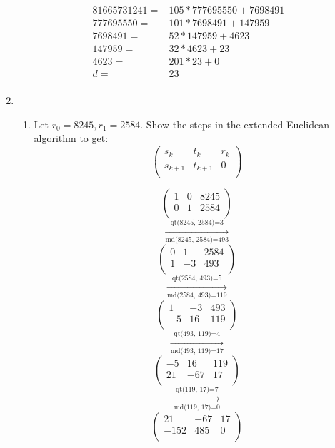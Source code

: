 \documentclass[11pt]{article}
\begin{document}
\begin{enumerate}
\begin{align*}
81665731241 =& 105 * 777695550 + 7698491\\
777695550 =& 101 * 7698491 + 147959\\
7698491 =& 52 * 147959 + 4623\\
147959 =& 32 * 4623 + 23\\
4623 =& 201 * 23 + 0\\
d =& 23\\
\end{align*}

\newpage %
\item 
\begin{enumerate}
\item Let $r_0 = 8245, r_1 = 2584$.  Show the steps in the extended Euclidean algorithm to get:
\begin{equation*}
\left(
\begin{array}{ccc}
s_k & t_k & r_k \\
s_{k+1} & t_{k+1} & 0 \\
\end{array} \right)
\end{equation*}

\begin{equation*}
\left(
\begin{array}{ccc}
 1 & 0 & 8245 \\
 0 & 1 & 2584 \\
\end{array}
\right)
\end{equation*}
$$\xrightarrow[\text{md(8245, 2584)=493}]{\text{qt(8245, 2584)=3}}$$
\begin{equation*}
\left(
\begin{array}{ccc}
 0 & 1 & 2584 \\
 1 & -3 & 493 \\
\end{array}
\right)
\end{equation*}
$$\xrightarrow[\text{md(2584, 493)=119}]{\text{qt(2584, 493)=5}}$$
\begin{equation*}
\left(
\begin{array}{ccc}
 1 & -3 & 493 \\
 -5 & 16 & 119 \\
\end{array}
\right)
\end{equation*}
$$\xrightarrow[\text{md(493, 119)=17}]{\text{qt(493, 119)=4}}$$
\begin{equation*}
\left(
\begin{array}{ccc}
 -5 & 16 & 119 \\
 21 & -67 & 17 \\
\end{array}
\right)
\end{equation*}
$$\xrightarrow[\text{md(119, 17)=0}]{\text{qt(119, 17)=7}}$$
\begin{equation*}
\left(
\begin{array}{ccc}
 21 & -67 & 17 \\
 -152 & 485 & 0 \\
\end{array}
\right)
\end{equation*}


\end{enumerate}
\end{enumerate}
\end{document}

